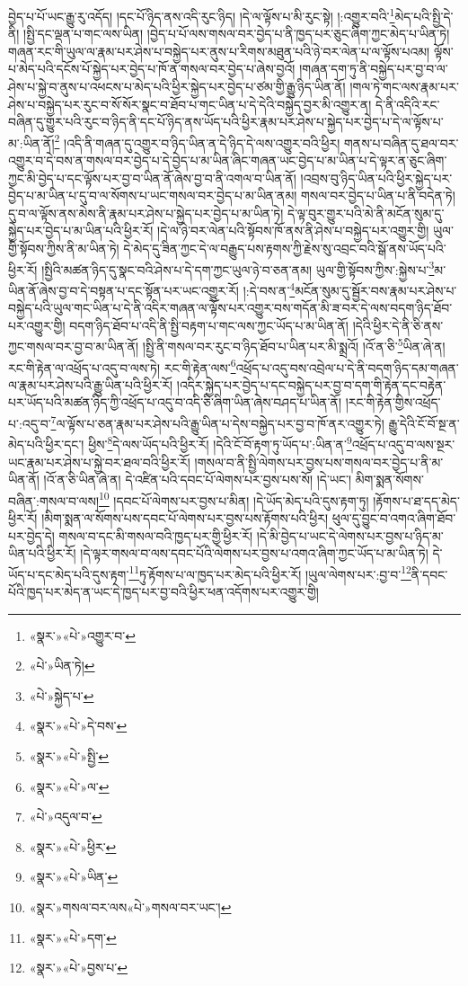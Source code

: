 བྱེད་པ་པོ་ཡང་རྒྱུ་རུ་འདོད། །དང་པོ་ཉིད་ནས་འདི་རུང་ཉིད། །དེ་ལ་ལྟོས་པ་མི་རུང་སྟེ། །:འགྱུར་བའི་\footnote{«སྣར་»«པེ་»འགྱུར་བ་}མེད་པའི་སྤྱི་དེ་ནི། །སྤྱི་དང་ལྡན་པ་གང་ལས་ཡིན། །བྱེད་པ་པོ་ལས་གསལ་བར་བྱེད་པ་ནི་ཁྱད་པར་ཅུང་ཞིག་ཀྱང་མེད་པ་ཡིན་ཏེ། གཞན་རང་གི་ཡུལ་ལ་རྣམ་པར་ཤེས་པ་བསྐྱེད་པར་ནུས་པ་རིགས་མཐུན་པའི་ཉེ་བར་ལེན་པ་ལ་ལྟོས་པའམ། ལྟོས་པ་མེད་པའི་དངོས་པོ་སྐྱེད་པར་བྱེད་པ་ཁོ་ན་གསལ་བར་བྱེད་པ་ཞེས་བྱའོ། །གཞན་དག་ཏུ་ནི་བསྐྱེད་པར་བྱ་བ་ལ་ཤེས་པ་སྐྱེ་བ་ནུས་པ་འཕངས་པ་མེད་པའི་ཕྱིར་སྐྱེད་པར་བྱེད་པ་ཙམ་གྱི་རྒྱུ་ཉིད་ཡིན་ནོ། །གལ་ཏེ་གང་ལས་རྣམ་པར་ཤེས་པ་བསྐྱེད་པར་རུང་བ་སོ་སོར་སྣང་བ་ཐོབ་པ་གང་ཡིན་པ་དེ་དེའི་བསྐྱེད་བྱར་མི་འགྱུར་ན། དེ་ནི་འདིའི་རང་བཞིན་དུ་གྱུར་པའི་རུང་བ་ཉིད་ནི་དང་པོ་ཉིད་ནས་ཡོད་པའི་ཕྱིར་རྣམ་པར་ཤེས་པ་སྐྱེད་པར་བྱེད་པ་དེ་ལ་ལྟོས་པ་མ་:ཡིན་ནོ།\footnote{«པེ་»ཡིན་ཏེ།} །འདི་ནི་གཞན་དུ་འགྱུར་བ་ཉིད་ཡིན་ན་དེ་ཉིད་དེ་ལས་འགྱུར་བའི་ཕྱིར། གནས་པ་བཞིན་དུ་ཐལ་བར་འགྱུར་བ་དེ་བས་ན་གསལ་བར་བྱེད་པ་དེ་བྱེད་པ་མ་ཡིན་ཞིང་གཞན་ཡང་བྱེད་པ་མ་ཡིན་པ་དེ་ལྟར་ན་ཅུང་ཞིག་ཀྱང་མི་བྱེད་པ་དང་ལྟོས་པར་བྱ་བ་ཡིན་ནོ་ཞེས་བྱ་བ་ནི་འགལ་བ་ཡིན་ནོ། །འབྲས་བུ་ཉིད་ཡིན་པའི་ཕྱིར་སྐྱེད་པར་བྱེད་པ་མ་ཡིན་པ་དུ་བ་ལ་སོགས་པ་ཡང་གསལ་བར་བྱེད་པ་མ་ཡིན་ནམ། གསལ་བར་བྱེད་པ་ཡིན་པ་ནི་བདེན་ཏེ། དུ་བ་ལ་ལྟོས་ནས་མེས་ནི་རྣམ་པར་ཤེས་པ་སྐྱེད་པར་བྱེད་པ་མ་ཡིན་ཏེ། དེ་ལྟ་བུར་གྱུར་པའི་མེ་ནི་མངོན་སུམ་དུ་སྐྱེད་པར་བྱེད་པ་མ་ཡིན་པའི་ཕྱིར་རོ། །དེ་ལ་ཉེ་བར་ལེན་པའི་སྟོབས་ཁོ་ནས་ནི་ཤེས་པ་བསྐྱེད་པར་འགྱུར་གྱི། ཡུལ་གྱི་སྟོབས་ཀྱིས་ནི་མ་ཡིན་ཏེ། དེ་མེད་དུ་ཟིན་ཀྱང་དེ་ལ་བརྒྱུད་པས་རྟགས་ཀྱི་རྗེས་སུ་འབྲང་བའི་སྒོ་ནས་ཡོད་པའི་ཕྱིར་རོ། །སྤྱིའི་མཚན་ཉིད་དུ་སྣང་བའི་ཤེས་པ་དེ་དག་ཀྱང་ཡུལ་ཉེ་བ་ཅན་ནམ། ཡུལ་གྱི་སྟོབས་ཀྱིས་:སྐྱེས་པ་\footnote{«པེ་»སྐྱེད་པ་}མ་ཡིན་ནོ་ཞེས་བྱ་བ་དེ་བསྟན་པ་དང་སྟོན་པར་ཡང་འགྱུར་རོ། །:དེ་བས་ན་\footnote{«སྣར་»«པེ་»དེ་བས་}མངོན་སུམ་དུ་སྦྱོར་བས་རྣམ་པར་ཤེས་པ་བསྐྱེད་པའི་ཡུལ་གང་ཡིན་པ་དེ་ནི་འདིར་གཞན་ལ་ལྟོས་པར་འགྱུར་བས་གདོན་མི་ཟ་བར་དེ་ལས་བདག་ཉིད་ཐོབ་པར་འགྱུར་གྱི། བདག་ཉིད་ཐོབ་པ་འདི་ནི་སྤྱི་བརྟག་པ་གང་ལས་ཀྱང་ཡོད་པ་མ་ཡིན་ནོ། །དེའི་ཕྱིར་དེ་ནི་ཅི་ནས་ཀྱང་གསལ་བར་བྱ་བ་མ་ཡིན་ནོ། །སྤྱི་ནི་གསལ་བར་རུང་བ་ཉིད་ཐོབ་པ་ཡིན་པར་མི་སྨྲའོ། །འོ་ན་ཅི་\footnote{«སྣར་»«པེ་»སྤྱི་}ཡིན་ཞེ་ན། རང་གི་རྟེན་ལ་འཕྲོད་པ་འདུ་བ་ལས་ཏེ། རང་གི་རྟེན་ལས་\footnote{«སྣར་»«པེ་»ལ་}འཕྲོད་པ་འདུ་བས་འབྲེལ་པ་དེ་ནི་བདག་ཉིད་དམ་གཞན་ལ་རྣམ་པར་ཤེས་པའི་རྒྱུ་ཡིན་པའི་ཕྱིར་རོ། །འདིར་སྐྱེད་པར་བྱེད་པ་དང་བསྐྱེད་པར་བྱ་བ་དག་གི་རྟེན་དང་བརྟེན་པར་ཡོད་པའི་མཚན་ཉིད་ཀྱི་འཕྲོད་པ་འདུ་བ་འདི་ཅི་ཞིག་ཡིན་ཞེས་བཤད་པ་ཡིན་ནོ། །རང་གི་རྟེན་གྱིས་འཕྲོད་པ་:འདུ་བ་\footnote{«པེ་»འདུལ་བ་}ལ་ལྟོས་པ་ཅན་རྣམ་པར་ཤེས་པའི་རྒྱུ་ཡིན་པ་དེས་བསྐྱེད་པར་བྱ་བ་ཁོ་ནར་འགྱུར་ཏེ། རྒྱུ་དེའི་ངོ་བོ་སྔ་ན་མེད་པའི་ཕྱིར་དང་། ཕྱིས་\footnote{«སྣར་»«པེ་»ཕྱིར་}དེ་ལས་ཡོད་པའི་ཕྱིར་རོ། །དེའི་ངོ་བོ་རྟག་ཏུ་ཡོད་པ་:ཡིན་ན་\footnote{«སྣར་»«པེ་»ཡིན་}འཕྲོད་པ་འདུ་བ་ལས་སྔར་ཡང་རྣམ་པར་ཤེས་པ་སྐྱེ་བར་ཐལ་བའི་ཕྱིར་རོ། །གསལ་བ་ནི་སྤྱི་ལེགས་པར་བྱས་པས་གསལ་བར་བྱེད་པ་ནི་མ་ཡིན་ནོ། །འོ་ན་ཅི་ཡིན་ཞེ་ན། དེ་འཛིན་པའི་དབང་པོ་ལེགས་པར་བྱས་པས་སོ། །དེ་ཡང་། མིག་སྨན་སོགས་བཞིན་:གསལ་བ་ལས།\footnote{«སྣར་»གསལ་བར་ལས«པེ་»གསལ་བར་ཡང་།} །དབང་པོ་ལེགས་པར་བྱས་པ་མིན། །དེ་ཡོད་མེད་པའི་དུས་རྟག་ཏུ། །རྟོགས་པ་ཐ་དད་མེད་ཕྱིར་རོ། །མིག་སྨན་ལ་སོགས་པས་དབང་པོ་ལེགས་པར་བྱས་པས་རྟོགས་པའི་ཕྱིར། ཕུལ་དུ་བྱུང་བ་འགའ་ཞིག་ཐོབ་པར་བྱེད་དེ། གསལ་བ་དང་མི་གསལ་བའི་ཁྱད་པར་གྱི་ཕྱིར་རོ། །དེ་མི་བྱེད་པ་ཡང་དེ་ལེགས་པར་བྱས་པ་ཉིད་མ་ཡིན་པའི་ཕྱིར་རོ། །དེ་ལྟར་གསལ་བ་ལས་དབང་པོའི་ལེགས་པར་བྱས་པ་འགའ་ཞིག་ཀྱང་ཡོད་པ་མ་ཡིན་ཏེ། དེ་ཡོད་པ་དང་མེད་པའི་དུས་རྟག་\footnote{«སྣར་»«པེ་»དག་}ཏུ་རྟོགས་པ་ལ་ཁྱད་པར་མེད་པའི་ཕྱིར་རོ། །ཡུལ་ལེགས་པར་:བྱ་བ་\footnote{«སྣར་»«པེ་»བྱས་པ་}ནི་དབང་པོའི་ཁྱད་པར་མེད་ན་ཡང་དེ་ཁྱད་པར་བྱ་བའི་ཕྱིར་ཕན་འདོགས་པར་འགྱུར་གྱི། 
